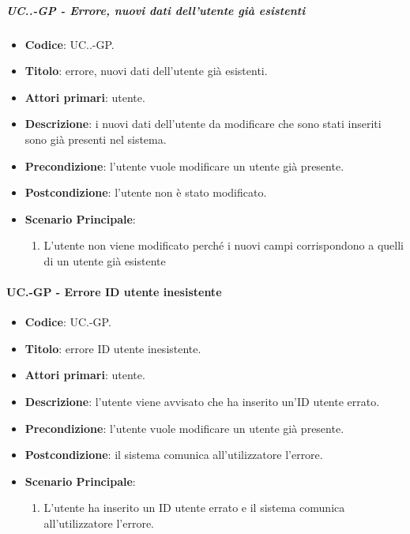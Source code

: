 		\subparagraph{UC\theuccount.\thesubuccount.\thesubsubuccount-GP - Errore, nuovi dati dell'utente già esistenti}
		
		\begin{itemize}
			\item \textbf{Codice}: UC\theuccount.\thesubuccount.\thesubsubuccount-GP.
			\item \textbf{Titolo}: errore, nuovi dati dell'utente già esistenti.
			\item \textbf{Attori primari}: utente.
			\item \textbf{Descrizione}: i nuovi dati dell'utente da modificare che sono stati inseriti sono già presenti nel sistema.
			\item \textbf{Precondizione}: l'utente vuole modificare un utente già presente.
			\item \textbf{Postcondizione}: l'utente non è stato modificato.
			\item \textbf{Scenario Principale}:
			\begin{enumerate}
				\item L'utente non viene modificato perché i nuovi campi corrispondono a quelli di un utente già esistente
			\end{enumerate}
		\end{itemize}
	\paragraph{UC\theuccount.\thesubuccount-GP - Errore ID utente inesistente}
		
		\begin{itemize}
			\item \textbf{Codice}: UC\theuccount.\thesubuccount-GP.
			\item \textbf{Titolo}: errore ID utente inesistente.
			\item \textbf{Attori primari}: utente.
			\item \textbf{Descrizione}:  l’utente viene avvisato che ha inserito un'ID utente errato.
			\item \textbf{Precondizione}: l'utente vuole modificare un utente già presente.
			\item \textbf{Postcondizione}: il sistema comunica all’utilizzatore l’errore.
			\item \textbf{Scenario Principale}:
			\begin{enumerate}
				\item L'utente ha inserito un ID utente errato e il sistema comunica all’utilizzatore l’errore.
			\end{enumerate}
		\end{itemize}